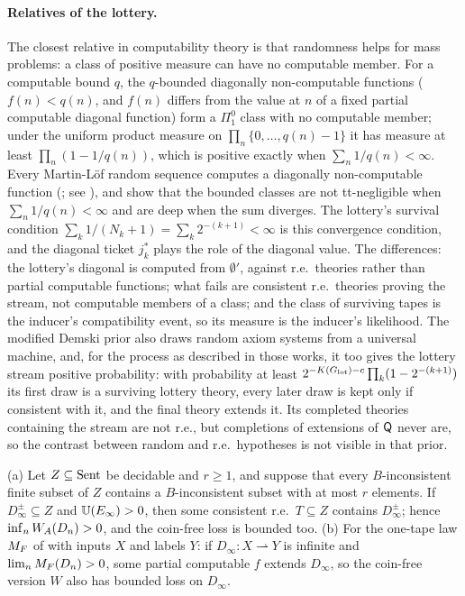 \paragraph{Relatives of the lottery.} The closest relative in computability theory is that randomness helps for mass problems: a class of positive measure can have no computable member. For a computable bound $q$, the $q$-bounded diagonally non-computable functions ($f(n)<q(n)$, and $f(n)$ differs from the value at $n$ of a fixed partial computable diagonal function) form a $\Pi^0_1$ class with no computable member; under the uniform product measure on $\prod_n\{0,\dots,q(n)-1\}$ it has measure at least $\prod_n(1-1/q(n))$, which is positive exactly when $\sum_n1/q(n)<\infty$. Every Martin-L\"of random sequence computes a diagonally non-computable function (\citealp{kucera1985measure}; see \citealp{bienvenu2017diagonally}), and \citet{bienvenu2016deep} show that the bounded classes are not tt-negligible when $\sum_n1/q(n)<\infty$ and are deep when the sum diverges. The lottery's survival condition $\sum_k1/(N_k+1)=\sum_k2^{-(k+1)}<\infty$ is this convergence condition, and the diagonal ticket $j^*_k$ plays the role of the diagonal value. The differences: the lottery's diagonal is computed from $\emptyset'$, against r.e.\ theories rather than partial computable functions; what fails are consistent r.e.\ theories proving the stream, not computable members of a class; and the class of surviving tapes is the inducer's compatibility event, so its measure is the inducer's likelihood. The modified Demski prior \citep{garrabrant2015modification,garrabrant2016inductive} also draws random axiom systems from a universal machine, and, for the process as described in those works, it too gives the lottery stream positive probability: with probability at least $2^{-K(G_{\mathrm{lot}})-c}\prod_k(1-2^{-(k+1)})$ its first draw is a surviving lottery theory, every later draw is kept only if consistent with it, and the final theory extends it. Its completed theories containing the stream are not r.e., but completions of extensions of $\mathsf{Q}$ never are, so the contrast between random and r.e.\ hypotheses is not visible in that prior.

\begin{proposition}\label{prop:logic:arity}
(a) Let $Z\subseteq\mathrm{Sent}$ be decidable and $r\ge1$, and suppose that every $B$-inconsistent finite subset of $Z$ contains a $B$-inconsistent subset with at most $r$ elements. If $D_\infty^\pm\subseteq Z$ and $\mathbb{U}(E_\infty)>0$, then some consistent r.e.\ $T\subseteq Z$ contains $D_\infty^\pm$; hence $\inf_nW_{A}(D_n)>0$, and the coin-free loss is bounded too.
(b) For the one-tape law $M_{F}$ of \SOIabbr with inputs $X$ and labels $Y$: if $D_\infty:X\rightharpoonup Y$ is infinite and $\lim_nM_{F}(D_n)>0$, some partial computable $f$ extends $D_\infty$, so the coin-free version $W$ also has bounded loss on $D_\infty$.
\end{proposition}

